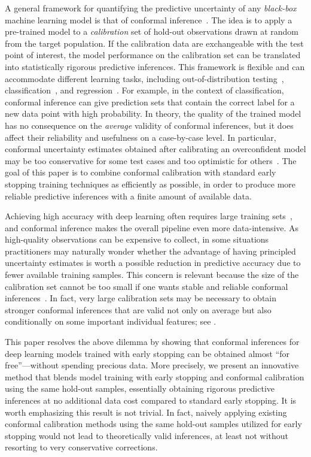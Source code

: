 A general framework for quantifying the predictive uncertainty of any {\em black-box} machine learning model is that of conformal inference~\citep{vovk2005algorithmic}.
The idea is to apply a pre-trained model to a {\em calibration} set of hold-out observations drawn at random from the target population.
If the calibration data are exchangeable with the test point of interest, the model performance on the calibration set can be translated into statistically rigorous predictive inferences.
This framework is flexible and can accommodate different learning tasks, including out-of-distribution testing~\citep{smith2015conformal}, classification~\citep{vovk2003mondrian}, and regression~\citep{vovk2005algorithmic}.
For example, in the context of classification, conformal inference can give prediction sets that contain the correct label for a new data point with high probability.
In theory, the quality of the trained model has no consequence on the {\em average} validity of conformal inferences, but it does affect their reliability and usefulness on a case-by-case level.
In particular, conformal uncertainty estimates obtained after calibrating an overconfident model may be too conservative for some test cases and too optimistic for others~\citep{romano2020classification}.
The goal of this paper is to combine conformal calibration with standard early stopping training techniques as efficiently as possible, in order to produce more reliable predictive inferences with a finite amount of available data.

Achieving high accuracy with deep learning often requires large training sets~\citep{marcus2018deep}, and conformal inference makes the overall pipeline even more data-intensive.
As high-quality observations can be expensive to collect, in some situations practitioners may naturally wonder whether the advantage of having principled uncertainty estimates is worth a possible reduction in predictive accuracy due to fewer available training samples.
This concern is relevant because the size of the calibration set cannot be too small if one wants stable and reliable conformal inferences~\citep{vovk2012conditional,sesia2020comparison}.
In fact, very large calibration sets may be necessary to obtain stronger conformal inferences that are valid not only on average but also conditionally on some important individual features; see \citet{vovk2003mondrian,romano2019malice,barber2019limits}.

This paper resolves the above dilemma by showing that conformal inferences for deep learning models trained with early stopping can be obtained almost ``for free''---without spending precious data.
More precisely, we present an innovative method that blends model training with early stopping and conformal calibration using the same hold-out samples, essentially obtaining rigorous predictive inferences at no additional data cost compared to standard early stopping.
It is worth emphasizing this result is not trivial.
In fact, naively applying existing conformal calibration methods using the same hold-out samples utilized for early stopping would not lead to theoretically valid inferences, at least not without resorting to very conservative corrections.


